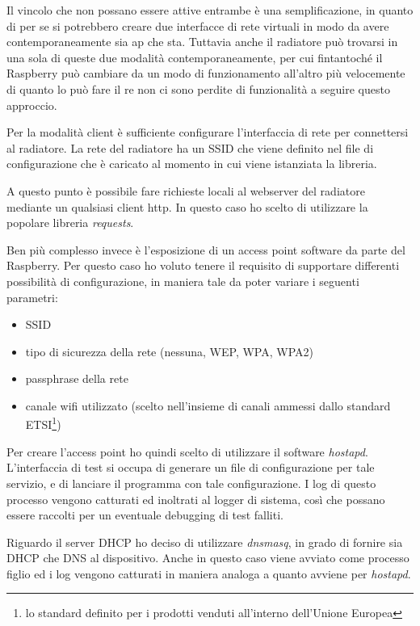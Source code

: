 \documentclass[12pt,a4paper,twoside,titlepage]{book}
\begin{document}
Il vincolo che non possano essere attive entrambe è una semplificazione, in quanto di per 
se si potrebbero creare due interfacce di rete virtuali in modo da avere contemporaneamente sia 
\acrshort{ap} che \acrshort{sta}. Tuttavia anche il radiatore può trovarsi in una sola di 
queste due modalità contemporaneamente, per cui fintantoché il Raspberry può cambiare da un modo 
di funzionamento all'altro più velocemente di quanto lo può fare il \acrshort{re} non ci sono 
perdite di funzionalità a seguire questo approccio. 

Per la modalità client è sufficiente configurare l'interfaccia di rete per connettersi
al radiatore. La rete del radiatore ha un SSID che viene definito nel file di configurazione 
che è caricato al momento in cui viene istanziata la libreria. 

A questo punto è possibile fare richieste locali al webserver del radiatore mediante
un qualsiasi client \acrshort{http}. In questo caso ho scelto di utilizzare la popolare
libreria \textit{requests}.

Ben più complesso invece è l'esposizione di un access point software da parte del
Raspberry. Per questo caso ho voluto tenere il requisito di supportare differenti
possibilità di configurazione, in maniera tale da poter variare i seguenti parametri:
\begin{itemize}
    \item SSID
    \item tipo di sicurezza della rete (nessuna, WEP, WPA, WPA2)
    \item passphrase della rete
    \item canale \Gls{wifi} utilizzato (scelto nell'insieme di canali ammessi dallo standard ETSI\footnote{
        lo standard definito per i prodotti venduti all'interno dell'Unione Europea})
\end{itemize}

Per creare l'access point ho quindi scelto di utilizzare il software \textit{hostapd}.
L'interfaccia di test si occupa di generare un file di configurazione per tale
servizio, e di lanciare il programma con tale configurazione. I log di questo processo vengono
catturati ed inoltrati al logger di sistema, così che possano essere raccolti
per un eventuale debugging di test falliti.

Riguardo il server DHCP ho deciso di utilizzare \textit{dnsmasq}, 
in grado di fornire sia DHCP che DNS al dispositivo.
Anche in questo caso viene avviato come processo figlio ed i log vengono catturati
in maniera analoga a quanto avviene per \textit{hostapd}.
\end{document}
